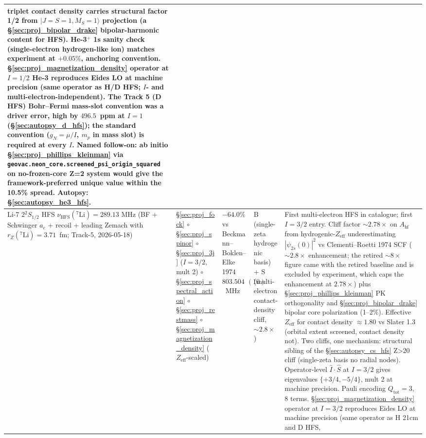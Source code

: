 \documentclass[11pt]{article}
\begin{document}
{\begin{longtable}{p{3.8cm} p{2.5cm} p{1.5cm} p{1.4cm} p{4.5cm}}
triplet contact density carries structural factor 1/2 from
$|J=S=1, M_S=1\rangle$ projection (a
\S\ref{sec:proj_bipolar_drake} bipolar-harmonic content for HFS).
He-3$^+$ 1s sanity check (single-electron hydrogen-like ion) matches
experiment at $+0.05\%$, anchoring convention.
\S\ref{sec:proj_magnetization_density} operator at $I=1/2$ He-3
reproduces Eides LO at machine precision (same operator as H/D HFS;
$I$- and multi-electron-independent).
The Track 5 (D HFS) Bohr--Fermi mass-slot convention was a driver
error, high by $496.5$~ppm at $I=1$ (\S\ref{sec:autopsy_d_hfs}); the
standard convention ($g_N = \mu/I$, $m_p$ in mass slot) is required at
every $I$. \textbf{Named follow-on}: ab initio
\S\ref{sec:proj_phillips_kleinman} via
\texttt{geovac.neon\_core.screened\_psi\_origin\_squared} on
no-frozen-core Z=2 system would give the framework-preferred unique
value within the 10.5\% spread. Autopsy:
\S\ref{sec:autopsy_he3_hfs}. \\
\midrule
Li-7 $2{}^2S_{1/2}$ HFS $\nu_\text{HFS}({}^7\text{Li}) = 289.13$ MHz
(BF + Schwinger $a_e$ + recoil + leading Zemach with
$r_Z({}^7\text{Li}) = 3.71$~fm; Track-5, 2026-05-18) &
\S\ref{sec:proj_fock} $\circ$ \S\ref{sec:proj_spinor} $\circ$
\S\ref{sec:proj_3j} ($I=3/2$, mult 2) $\circ$
\S\ref{sec:proj_spectral_action} $\circ$ \S\ref{sec:proj_restmass}
$\circ$ \S\ref{sec:proj_magnetization_density} ($Z_\text{eff}$-scaled) &
$-64.0\%$ vs Beckmann--Boklen--Elke 1974 $803.5040866(10)$~MHz &
B (single-zeta hydrogenic basis) + S (multi-electron contact-density
cliff, $\sim 2.8\times$) &
First multi-electron HFS in catalogue; first $I=3/2$ entry.  Cliff
factor $\sim 2.78\times$ on $A_\text{hf}$ from hydrogenic-$Z_\text{eff}$
underestimating $|\psi_{2s}(0)|^2$ vs Clementi--Roetti 1974 SCF
($\sim 2.8\times$ enhancement; the retired $\sim 8\times$ figure came with
the retired baseline and is excluded by experiment, which caps the
enhancement at $2.78\times$) plus \S\ref{sec:proj_phillips_kleinman} PK
orthogonality and \S\ref{sec:proj_bipolar_drake} bipolar core
polarization (1--2\%).  Effective $Z_\text{eff}$ for contact density
$\approx 1.80$ vs Slater 1.3 (orbital extent screened, contact density
not).  Two cliffs, one mechanism: structural sibling of the
\S\ref{sec:autopsy_cs_hfs} Z\textgreater 20 cliff (single-zeta basis
no radial nodes).  Operator-level $\hat{I}\cdot\hat{S}$ at $I=3/2$
gives eigenvalues $\{+3/4,-5/4\}$, mult 2 at machine precision.
Pauli encoding $Q_\text{tot}=3$, 8 terms.
\S\ref{sec:proj_magnetization_density} operator at $I=3/2$ reproduces
Eides LO at machine precision (same operator as H 21cm and D HFS,

\end{longtable}}
\end{document}
